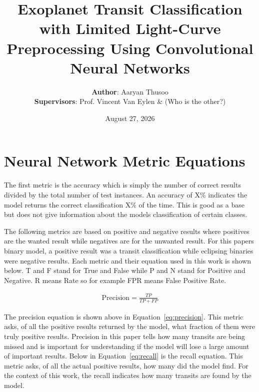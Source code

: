 \documentclass[12pt]{article}%
\title{\textbf{Exoplanet Transit Classification with Limited Light-Curve Preprocessing Using Convolutional Neural Networks}}
\date{August 27, 2026}
\author{\textbf{Author}: Aaryan Thusoo \\ \textbf{Supervisors}: Prof. Vincent Van Eylen \& (Who is the other?)}
\begin{document}
\maketitle
{}
\thispagestyle{empty}













\newpage 
\appendix \label{sec:Appendix}

\section{Neural Network Metric Equations} \label{sec:NN_equations}

The first metric is the accuracy which is simply the number of correct results divided by the total number of test instances. An accuracy of X\% indicates the model returns the correct classification X\% of the time. This is good as a base but does not give information about the models classification of certain classes.

The following metrics are based on positive and negative results where positives are the wanted result while negatives are for the unwanted result. For this papers binary model, a positive result was a transit classification while eclipsing binaries were negative results. Each metric and their equation used in this work is shown below. T and F stand for True and False while P and N stand for Positive and Negative. R means Rate so for example FPR means False Positive Rate.

\begin{align}
    \text{Precision} = \frac{TP}{TP+FP} \label{eq:precision}
\end{align}

The precision equation is shown above in Equation~\ref{eq:precision}. This metric asks, of all the positive results returned by the model, what fraction of them were truly positive results. Precision in this paper tells how many transits are being missed and is important for understanding if the model will lose a large amount of important results. Below in Equation~\ref{eq:recall} is the recall equation. This metric asks, of all the actual positive results, how many did the model find. For the context of this work, the recall indicates how many transits are found by the model.
\end{document}

